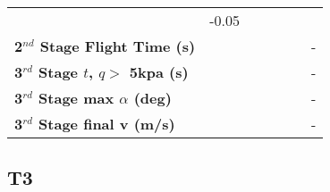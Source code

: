 \begin{tabular}{l c c c c c c}
	&-0.05
	\\
	\textbf{2$^{nd}$ Stage Flight Time (s)}
	& \secondFlightTimemThreeNinetyNoReturn
	& \secondFlightTimemThreeNinetyFiveNoReturn
	& \secondFlightTimemThreeStandardNoReturn
	& \secondFlightTimemThreeOneHundredFiveNoReturn
	& \secondFlightTimemThreeOneHundredTenNoReturn
	& -
	\\
	\textbf{3$^{rd}$ Stage $t$, $q >$ 5kpa (s)}
	& \thirdqOverFivemThreeNinetyNoReturn
	& \thirdqOverFivemThreeNinetyFiveNoReturn
	& \thirdqOverFivemThreeStandardNoReturn
	& \thirdqOverFivemThreeOneHundredFiveNoReturn
	& \thirdqOverFivemThreeOneHundredTenNoReturn
	& -
	\\
	\textbf{3$^{rd}$ Stage max $\alpha$ (deg)}
	& \thirdmaxAoAmThreeNinetyNoReturn
	& \thirdmaxAoAmThreeNinetyFiveNoReturn
	& \thirdmaxAoAmThreeStandardNoReturn
	& \thirdmaxAoAmThreeOneHundredFiveNoReturn
	& \thirdmaxAoAmThreeOneHundredTenNoReturn
	& -
	\\
	\textbf{3$^{rd}$ Stage final v (m/s)}
	& \thirdcircvmThreeNinetyNoReturn
	& \thirdcircvmThreeNinetyFiveNoReturn
	& \thirdcircvmThreeStandardNoReturn
	& \thirdcircvmThreeOneHundredFiveNoReturn
	& \thirdcircvmThreeOneHundredTenNoReturn
	& -
	\\
	\hline 
\end{tabular} 

\subsection{T3}

